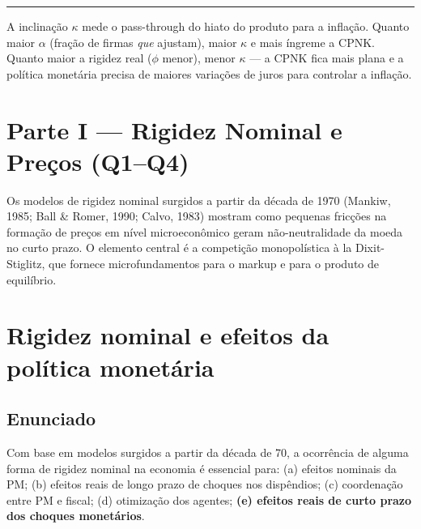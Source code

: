 \documentclass[12pt, a4paper]{article}
\begin{document}
\rule{\linewidth}{0.6pt}

\vspace{0.5em}
\begin{provabox}[title={Fórmula mais cobrada: inclinação da CPNK de Calvo}]
A inclinação $\kappa$ mede o pass-through do hiato do produto para a inflação.
Quanto maior $\alpha$ (fração de firmas \emph{que} ajustam), maior $\kappa$ e mais íngreme a CPNK.
Quanto maior a rigidez real ($\phi$ menor), menor $\kappa$ --- a CPNK fica mais plana e a
política monetária precisa de maiores variações de juros para controlar a inflação.
\end{provabox}

\newpage
\tableofcontents
\newpage


\section*{\large\color{cyanrbc} Parte I --- Rigidez Nominal e Preços (Q1--Q4)}

Os modelos de rigidez nominal surgidos a partir da década de 1970 (Mankiw, 1985;
Ball \& Romer, 1990; Calvo, 1983) mostram como pequenas fricções na formação de
preços em nível microeconômico geram não-neutralidade da moeda no curto prazo.
O elemento central é a competição monopolística à la Dixit-Stiglitz, que fornece
microfundamentos para o markup e para o produto de equilíbrio.

\bigskip
\setcounter{section}{0}

\section{Rigidez nominal e efeitos da política monetária}

\subsection*{Enunciado}
Com base em modelos surgidos a partir da década de 70, a ocorrência de alguma forma
de rigidez nominal na economia é essencial para: (a) efeitos nominais da PM; (b) efeitos
reais de longo prazo de choques nos dispêndios; (c) coordenação entre PM e fiscal;
(d) otimização dos agentes; \textbf{(e) efeitos reais de curto prazo dos choques monetários}.
\end{document}
